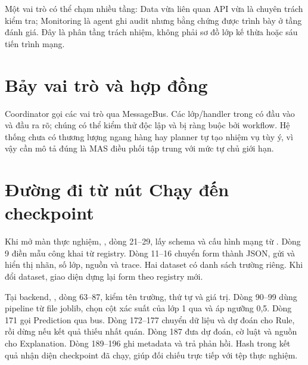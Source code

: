 Một vai trò có thể chạm nhiều tầng: Data vừa liên quan API vừa là chuyên trách kiểm tra; Monitoring là agent ghi audit nhưng bằng chứng được trình bày ở tầng đánh giá. Đây là phân tầng trách nhiệm, không phải sơ đồ lớp kế thừa hoặc sáu tiến trình mạng.

\section{Bảy vai trò và hợp đồng}

Coordinator gọi các vai trò qua MessageBus. Các lớp/handler trong  có đầu vào và đầu ra rõ; chúng có thể kiểm thử độc lập và bị ràng buộc bởi workflow. Hệ thống chưa có thương lượng ngang hàng hay planner tự tạo nhiệm vụ tùy ý, vì vậy cần mô tả đúng là MAS điều phối tập trung với mức tự chủ giới hạn.

\section{Đường đi từ nút Chạy đến checkpoint}
Khi mở màn thực nghiệm, , dòng 21--29, lấy schema và cấu hình mạng từ . Dòng 9 điền mẫu công khai từ registry. Dòng 11--16 chuyển form thành JSON, gửi  và hiển thị nhãn, số lớp, nguồn và trace. Hai dataset có danh sách trường riêng. Khi đổi dataset, giao diện dựng lại form theo registry mới.

Tại backend, , dòng 63--87, kiểm tên trường, thứ tự và giá trị. Dòng 90--99 dùng pipeline từ file joblib, chọn cột xác suất của lớp 1 qua  và áp ngưỡng 0,5. Dòng 171 gọi Prediction qua bus. Dòng 172--177 chuyển dữ liệu và dự đoán cho Rule, rồi dừng nếu kết quả thiếu nhất quán. Dòng 187 đưa dự đoán, cờ luật và nguồn cho Explanation. Dòng 189--196 ghi metadata và trả phản hồi. Hash trong kết quả nhận diện checkpoint đã chạy, giúp đối chiếu trực tiếp với tệp thực nghiệm.

